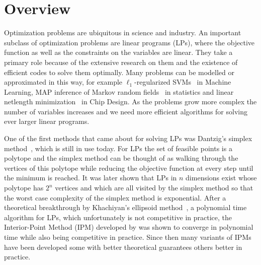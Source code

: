 \chapter{Overview}\label{chap:introduction}

Optimization problems are ubiquitous in science and industry.
An important subclass of optimization problems are linear programs (LPs), where the objective function as well as the constraints on the variables are linear.
They take a primary role because of the extensive research on them and the existence of efficient codes to solve them optimally.
Many problems can be modelled or approximated in this way, for example \(\ell_1\)-regularized SVMs~\cite{ZhuRossetTibshiraniHastie-1normSupportVectorMachines} in Machine Learning, MAP inference of Markov random fields~\cite{MeshiGloberson-MapLpRelaxation} in statistics and linear netlength minimization~\cite{BrennerVygen-AnalyticalMethodsInVlsiPlacement} in Chip Design.
As the problems grow more complex the number of variables increases and we need more efficient algorithms for solving ever larger linear programs.

One of the first methods that came about for solving LPs was Dantzig's simplex method~\cite{Dantzig-Simplex}, which is still in use today.
For LPs the set of feasible points is a polytope and the simplex method can be thought of as walking through the vertices of this polytope while reducing the objective function at every step until the minimum is reached.
It was later shown that LPs in \(n\) dimensions exist whose polytope has \(2^n\) vertices and which are all visited by the simplex method so that the worst case complexity of the simplex method is exponential.
After a theoretical breakthrough by Khachiyan's ellipsoid method~\cite{Khachiyan-Ellipsoid1,Khachiyan-Ellipsoid2}, a polynomial time algorithm for LPs, which unfortunately is not competitive in practice, the Interior-Point Method (IPM) developed by \textcite{Karmarkar-IPM} was shown to converge in polynomial time while also being competitive in practice.
Since then many variants of IPMs have been developed some with better theoretical guarantees others better in practice.

